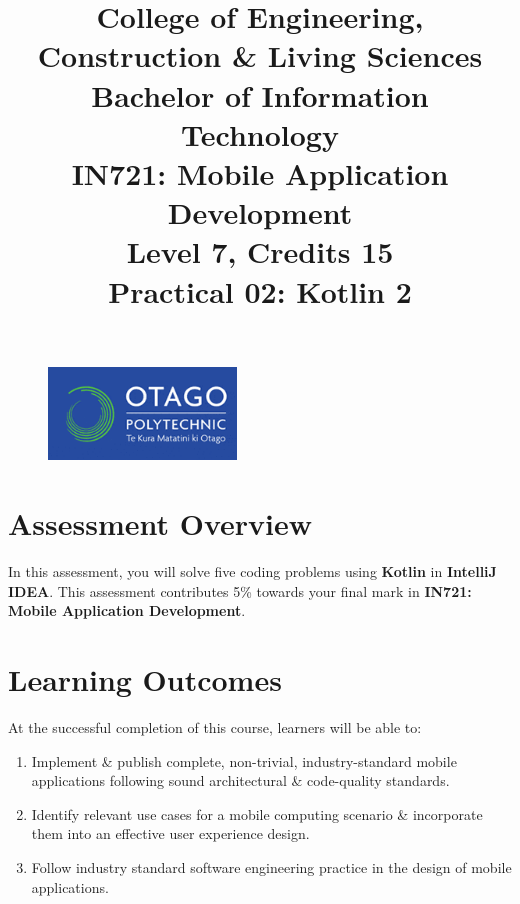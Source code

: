 \documentclass{article}
\author{}
\begin{document}
\begin{figure}
    \centering
    \includegraphics[width=50mm]{../../resources/img/logo.png}
\end{figure}

\title{College of Engineering, Construction \& Living Sciences\\Bachelor of Information Technology\\IN721: Mobile Application Development\\Level 7, Credits 15\\\textbf{Practical 02: Kotlin 2}}
\date{}
\maketitle

\section*{Assessment Overview}
In this assessment, you will solve five coding problems using \textbf{Kotlin} in \textbf{IntelliJ IDEA}. This assessment contributes 5\% towards your final mark in \textbf{IN721: Mobile Application Development}.

\section*{Learning Outcomes}
At the successful completion of this course, learners will be able to: 
\begin{enumerate}
	\item Implement \& publish complete, non-trivial, industry-standard mobile applications following sound architectural \& code-quality standards.
	\item Identify relevant use cases for a mobile computing scenario \& incorporate them into an effective user experience design.
	\item Follow industry standard software engineering practice in the design of mobile applications.
\end{enumerate} 
\end{document}
